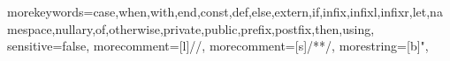 

\usepackage{a4wide}

\sloppy


\usepackage{mathpazo}

\usepackage[T1]{fontenc}
\usepackage{textcomp}
\usepackage[scaled=0.86]{beramono}

\usepackage{sectsty}

\usepackage[titles]{tocloft}
\renewcommand{\cftsecfont}{\usefont{OT1}{phv}{bc}{n}}
\setlength{\cftsubsecnumwidth}{2.5em}

\usepackage{listings}
{morekeywords={case,when,with,end,const,def,else,extern,if,infix,infixl,infixr,let,namespace,nullary,of,otherwise,private,public,prefix,postfix,then,using},
 sensitive=false,
 morecomment=[l]{//},
 morecomment=[s]{/*}{*/},
 morestring=[b]",
}
\lstset{language=pure,columns=flexible}
\lstset{basicstyle=\ttfamily,keepspaces=true,commentstyle=}

\usepackage[breaklinks]{hyperref}
\hypersetup{bookmarksnumbered,pdfborder=0 0 0}

\renewenvironment{optionlist}[1]
{\begin{list}{}{\renewcommand{\makelabel}{\optionlistlabel}}}{\end{list}}
\renewcommand{\optionlistlabel}[1]{\texttt{\textbf{#1}} \hfill}
